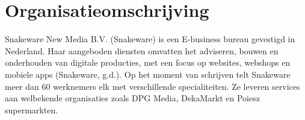 \section{Organisatieomschrijving}
Snakeware New Media B.V. (Snakeware) is een E-business bureau gevestigd in Nederland. Haar
aangeboden diensten omvatten het adviseren, bouwen en onderhouden van digitale producties, met
een focus op websites, webshops en mobiele apps (Snakeware, g.d.). Op het moment van schrijven
telt Snakeware meer dan 60 werknemers elk met verschillende specialiteiten. Ze leveren services
aan welbekende organisaties zoals DPG Media, DekaMarkt en Poiesz supermarkten.

